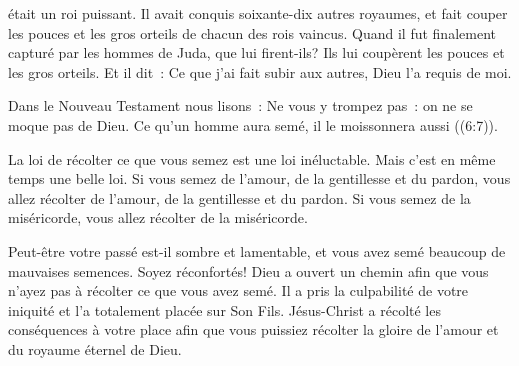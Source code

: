 

 était un roi puissant.
 Il avait conquis soixante-dix autres royaumes, et fait couper les pouces
 et les gros orteils de chacun des rois vaincus.
 Quand il fut finalement capturé par les hommes de Juda, que lui firent-ils?
 Ils lui coupèrent les pouces et les gros orteils.
 Et il dit~: \og Ce que j'ai fait subir aux autres, Dieu l'a requis de moi. \fg{}

Dans le Nouveau Testament nous lisons~:
 \og Ne vous y trompez pas~: on ne se moque pas de Dieu.
 Ce qu'un homme aura semé, il le moissonnera aussi \fg{} ((6:7)).


La loi de récolter ce que vous semez est une loi inéluctable.
 Mais c'est en même temps une belle loi.
 Si vous semez de l'amour, de la gentillesse et du pardon,
 vous allez récolter de l'amour, de la gentillesse et du pardon.
 Si vous semez de la miséricorde, vous allez récolter de la miséricorde.

Peut-être votre passé est-il sombre et lamentable,
 et vous avez semé beaucoup de mauvaises semences.
 Soyez réconfortés!
 Dieu a ouvert un chemin afin que vous n'ayez pas à récolter
 ce que vous avez semé.
 Il a pris la culpabilité de votre iniquité et l'a totalement placée
 sur Son Fils.
 Jésus-Christ a récolté les conséquences à votre place
 \ocadr afin que vous puissiez récolter la gloire de l'amour
 et du royaume éternel de Dieu. 

\dvrule





